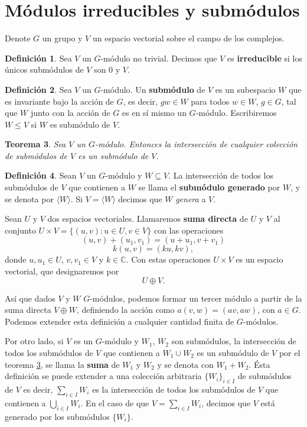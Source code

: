 \documentclass[12pt]{book}
\newtheorem{theorem}{Teorema}[section]
\theoremstyle{definition}
\newtheorem{definition}[theorem]{Definición}
\newcounter{in}
\newcounter{ini}
\begin{document}
\section{Módulos irreducibles y submódulos}
\label{mod-irr-submodulos}
Denote $G$ un grupo y $V$ un espacio vectorial sobre
el campo de los complejos. 

\begin{definition}
  Sea $V$ un $G$-módulo no trivial. Decimos que $V$ es \textbf{irreducible} si
  los únicos submódulos de $V$ son $0$ y $V$.
\end{definition}

\begin{definition}
  Sea $V$ un $G$-módulo. Un \textbf{submódulo} de $V$ es un subespacio
  $W$ que es invariante bajo la acción de $G$, es decir, $ gw\in W$
  para todos $w\in W$, $g\in G$, tal que $W$ junto con la acción de
  $G$ es en sí mismo un $G$-módulo. Escribiremos $W\leq V$ si $W$ es
  submódulo de $V$. 
\end{definition}

\begin{theorem}
  \label{interseccion-submodulos}
  Sea $V$ un $G$-módulo. Entonces la intersección de cualquier
  colección de submódulos de $V$ es un submódulo de $V$.
\end{theorem}

\begin{definition}
  Sean $V$ un $G$-módulo y $W\subseteq V$. La intersección de todos
  los submódulos de $V$ que contienen a $W$ se llama el \textbf{submódulo
  generado} por $W$, y se denota por $\langle W\rangle$. Si $V=\langle
  W \rangle$ decimos que $W$ \emph{genera} a $V$. 
\end{definition}

Sean $U$ y $V$ dos espacios vectoriales. Llamaremos \textbf{suma directa} de
$U$ y $V$ al conjunto $U\times V=\{(u,v):u\in U,v\in V\}$ con las operaciones
$$(u,v)+(u_{1},v_{1})=(u+u_{1},v+v_{1})$$
$$k(u,v)=(ku,kv),$$
donde $u,u_{1}\in U$, $v,v_{1}\in V$ y $k\in \mathbb{C}$. Con estas
operaciones $U\times V$ es un espacio vectorial, que designaremos por
$$U\oplus V.$$

Así que dados $V$ y $W$ $G$-módulos, podemos formar un tercer módulo a partir
de la suma directa $V\oplus W$, definiendo la acción como
$a(v,w)=(av,aw)$, con $a\in G$. Podemos extender esta definición a cualquier
cantidad finita de $G$-módulos.

Por otro lado, si $V$ es un $G$-módulo y $W_{1}$, $W_{2}$ son
submódulos, la intersección de todos los submódulos de $V$ que
contienen a $W_{1}\cup W_{2}$ es un submódulo de $V$ por el teorema
\ref{interseccion-submodulos}, se llama la \textbf{suma} de $W_{1}$ y $W_{2}$ y
se denota con $W_{1}+W_{2}$. Ésta definición se puede extender a una
colección arbitraria $\{W_{i}\}_{i\in I}$ de submódulos de $V$ es
decir, $\sum_{i\in I}W_{i}$ es la intersección de todos los submódulos de $V$ que
contienen a $\bigcup_{i\in I}W_{i}$. En el caso de que $V=\sum_{i\in
  I}W_{i}$, decimos que $V$ está generado por los submódulos
$\{W_{i}\}$.
\end{document}
